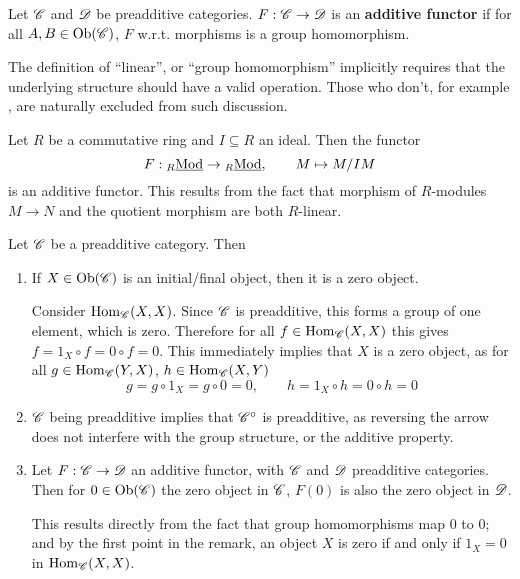 \documentclass{article}
\begin{document}
\begin{definition}
    Let $\mathscr{C}$ and $\mathscr{D}$ be preadditive categories. $F: \mathscr{C} \to \mathscr{D}$ is an \textbf{additive functor} if for all $A, B \in \mathrm{Ob}(\mathscr{C})$, $F$ w.r.t. morphisms is a group homomorphism.
\end{definition}

\begin{remark}
    The definition of ``linear'', or ``group homomorphism'' implicitly requires that the underlying structure should have a valid operation. Those who don't, for example \catsets, are naturally excluded from such discussion.
\end{remark}

\begin{example}
    Let $R$ be a commutative ring and $I \subseteq R$ an ideal. Then the functor
    \[
        F: {}_{R}\underline{\textup{Mod}} \to {}_{R}\underline{\textup{Mod}}, \qquad M \mapsto M/IM
    \]
    is an additive functor. This results from the fact that morphism of $R$-modules $M \to N$ and the quotient morphism are both $R$-linear.
\end{example}

\begin{remark}
    Let $\mathscr{C}$ be a preadditive category. Then
    \begin{enumerate}
        \item If $X \in \mathrm{Ob}(\mathscr{C})$ is an initial/final object, then it is a zero object. 
        
        Consider $\mathrm{Hom}_{\mathscr{C}}(X, X)$. Since $\mathscr{C}$ is preadditive, this forms a group of one element, which is zero. Therefore for all $f \in \mathrm{Hom}_{\mathscr{C}}(X, X)$ this gives $f = 1_X \circ f = 0 \circ f = 0$. This immediately implies that $X$ is a zero object, as for all $g \in \mathrm{Hom}_{\mathscr{C}}(Y, X)$, $h \in \mathrm{Hom}_{\mathscr{C}}(X, Y)$
        \[
            g = g \circ 1_{X} = g\circ 0 = 0, \qquad h = 1_X \circ h = 0 \circ h = 0
        \]
        \item $\mathscr{C}$ being preadditive implies that $\mathscr{C}^{\circ}$ is preadditive, as reversing the arrow does not interfere with the group structure, or the additive property.
        \item Let $F: \mathscr{C} \to \mathscr{D}$ an additive functor, with $\mathscr{C}$ and $
        \mathscr{D}$ preadditive categories. Then for $0 \in \mathrm{Ob}(\mathscr{C})$ the zero object in $\mathscr{C}$, $F(0)$ is also the zero object in $\mathscr{D}$.
        
        This results directly from the fact that group homomorphisms map $0$ to $0$; and by the first point in the remark, an object $X$ is zero if and only if $1_X = 0$ in $\mathrm{Hom}_{\mathscr{C}}(X, X)$.
    \end{enumerate}
\end{remark}
\end{document}
